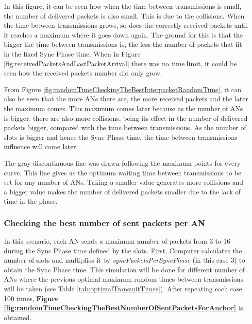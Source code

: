 In this figure, it can be seen how when the time between transmissions is small, the number of delivered packets is also small. This is due to the 
collisions. When the time between transmissions grows, so does the correctly received packets until it reaches a maximum where it goes down again.
The ground for this is that the bigger the time between transmissions is, the less the number of packets that fit in the fixed Sync Phase time. When in 
Figure \ref{fig:receivedPacketsAndLastPacketArrival} there was no time limit, it could be seen how the received packets number did only grow.

From Figure \ref{fig:randomTimeCheckingTheBestInterpacketRandomTime}, it can also be seen that the more \acp{AN} there are, the more received packets and
the later the maximum comes. This maximum comes later because as the number of \acp{AN} is bigger, there are also more collisions, being its effect in the 
number of delivered packets bigger, compared with the time between transmissions. As the number of slots is bigger and hence the Sync Phase time, the 
time between transmissions influence will come later.

The gray discontinuous line was drawn following the maximum points for every curve. This line gives us the optimum waiting time between transmissions to 
be set for any number of \acp{AN}. Taking a smaller value generates more collisions and a bigger value makes the number of delivered packets smaller due
to the lack of time in the phase.

\subsubsection{Checking the best number of sent packets per \ac{AN}}

In this scenario, each \ac{AN} sends a maximum number of packets from 3 to 16 during the Sync Phase time defined by the slots. First, Computer calculates 
the number of slots and multiplies it by \textit{syncPacketsPerSyncPhase} (in this case 3) to obtain the Sync Phase time. This simulation will be done 
for different number of \acp{AN} where the previous optimal maximum random times between transmissions will be taken (see Table
\ref{tab:optimalTransmitTimes}). After repeating each case 100 times, \textbf{Figure \ref{fig:randomTimeCheckingTheBestNumberOfSentPacketsForAnchor}} 
is obtained.

